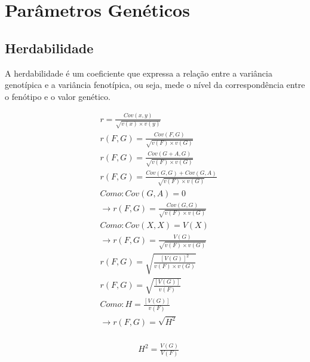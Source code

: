 

\chapter{Parâmetros Genéticos}

\section{Herdabilidade}

A herdabilidade é um coeficiente que expressa a relação entre a variância genotípica e a variância fenotípica, ou seja, mede o nível da correspondência entre o fenótipo e o valor genético. 

\begin{definition}

\begin{align}
&  r = \frac{Cov(x,y)}{\sqrt{v(x) \times v(y)}} \\
&  r(F,G) = \frac{Cov(F,G)}{\sqrt{v(F) \times v(G)}} \\
&  r(F,G) = \frac{Cov(G+A,G)}{\sqrt{v(F) \times v(G)}} \\
&  r(F,G) = \frac{Cov(G,G) + Cov(G,A)}{\sqrt{v(F) \times v(G)}} \\
&  Como: Cov(G,A) = 0 \\
&  \rightarrow r(F,G) = \frac{Cov(G,G)}{\sqrt{v(F) \times v(G)}} \\
&  Como: Cov(X,X) = V(X) \\
&  \rightarrow r(F,G) = \frac{V(G)}{\sqrt{v(F) \times v(G)}} \\
&  r(F,G) = \sqrt{\frac{[V(G)]^2}{v(F) \times v(G)}} \\
&  r(F,G) = \sqrt{\frac{[V(G)]}{v(F)}} \\
&  Como: H = \frac{[V(G)]}{v(F)} \\
&  \rightarrow  r(F,G) = \sqrt{H^2} \\
\end{align}
\end{definition}


\begin{definition}

\begin{align}
&  H^2 = \frac{V(G)}{V(F)} \\
\end{align}
\end{definition}

